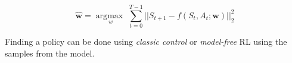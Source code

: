 	\begin{equation}
		\hat{\textbf{w}} = \underset{w}{\arg \text{max }}\sum_{t=0}^{T-1} ||S_{t+1} - f(S_t,A_t;\textbf{w})||^{2}_2
	\end{equation}

Finding a policy can be done using \emph{classic control} or \emph{model-free} RL using the samples from the model.














